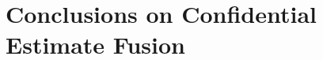 % 
%                                               
%                                               
%                                               
% 

\section{Conclusions on Confidential Estimate Fusion}


